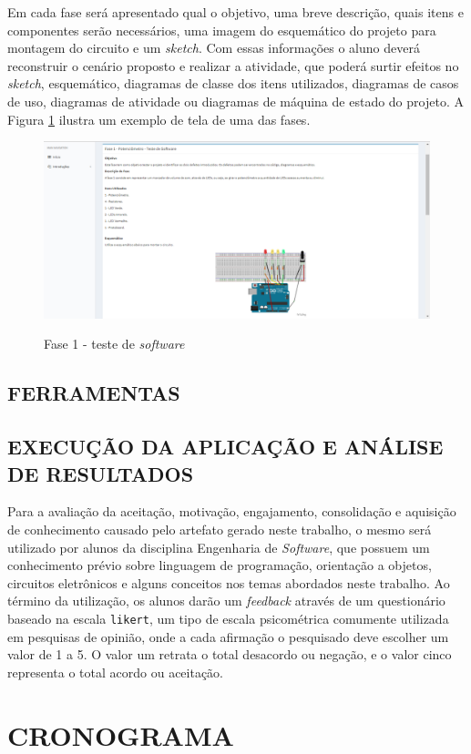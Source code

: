 Em cada fase será apresentado qual o objetivo, uma breve descrição, quais itens e componentes serão necessários, uma imagem do esquemático do projeto para montagem do circuito e um \textit{sketch}. Com essas informações o aluno deverá reconstruir o cenário proposto e realizar a atividade, que poderá surtir efeitos no \textit{sketch}, esquemático, diagramas de classe dos itens utilizados, diagramas de casos de uso, diagramas de atividade ou diagramas de máquina de estado do projeto. A Figura \ref{fig:figura-fase-tela} ilustra um exemplo de tela de uma das fases. 
\begin{figure}[!htb]
    \centering
    \caption{Fase 1 - teste de \textit{software}}
    \includegraphics[width=1\textwidth]{./dados/figuras/faseTela}
    \label{fig:figura-fase-tela}
\end{figure}

\section{FERRAMENTAS}
\label{sec:ferramentas}

\section{EXECUÇÃO DA APLICAÇÃO E ANÁLISE DE RESULTADOS}
\label{sec:execAppAnaliseResultados}
Para a avaliação da aceitação, motivação, engajamento, consolidação e aquisição de conhecimento causado pelo artefato gerado neste trabalho, o mesmo será utilizado por alunos da disciplina Engenharia de \textit{Software}, que possuem um conhecimento prévio sobre linguagem de programação, orientação a objetos, circuitos eletrônicos e alguns conceitos nos temas abordados neste trabalho. Ao término da utilização, os alunos darão um \textit{feedback} através de um questionário baseado na escala \texttt{likert}, um tipo de escala psicométrica comumente utilizada em pesquisas de opinião, onde a cada afirmação o pesquisado deve escolher um valor de 1 a 5. O valor um retrata o total desacordo ou negação, e o valor cinco representa o total acordo ou aceitação.


\chapter{CRONOGRAMA}
\label{chap:cronograma}